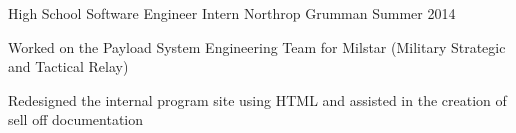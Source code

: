 \begin{cventries}
  \cventry
    {High School Software Engineer Intern} %
    {Northrop Grumman} %
    {Summer 2014} %
    {} %
    {
      \begin{cvitems} %
        \item {Worked on the Payload System Engineering Team for Milstar (Military Strategic and Tactical Relay)}
        \item {Redesigned the internal program site using HTML and assisted in the creation of sell off documentation}
      \end{cvitems}
    }

\end{cventries}
